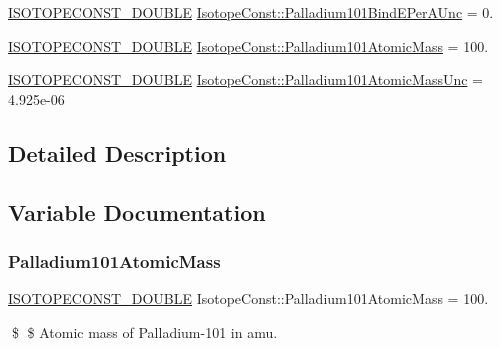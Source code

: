 \begin{DoxyCompactItemize}
\mbox{\hyperlink{group___isotope_const-_macros_ga8f45a7272ce02c0b4c65c44636ed719a}{I\+S\+O\+T\+O\+P\+E\+C\+O\+N\+S\+T\+\_\+\+D\+O\+U\+B\+LE}} \mbox{\hyperlink{group___isotope_const-_palladium-_pd101_gaee2d13e1c564da62fd571173f94e557b}{Isotope\+Const\+::\+Palladium101\+Bind\+E\+Per\+A\+Unc}} = 0.
\item 
\mbox{\hyperlink{group___isotope_const-_macros_ga8f45a7272ce02c0b4c65c44636ed719a}{I\+S\+O\+T\+O\+P\+E\+C\+O\+N\+S\+T\+\_\+\+D\+O\+U\+B\+LE}} \mbox{\hyperlink{group___isotope_const-_palladium-_pd101_gaa71177aebf9078683a5538af092f1757}{Isotope\+Const\+::\+Palladium101\+Atomic\+Mass}} = 100.
\item 
\mbox{\hyperlink{group___isotope_const-_macros_ga8f45a7272ce02c0b4c65c44636ed719a}{I\+S\+O\+T\+O\+P\+E\+C\+O\+N\+S\+T\+\_\+\+D\+O\+U\+B\+LE}} \mbox{\hyperlink{group___isotope_const-_palladium-_pd101_ga13dec64c735ec2c5944e17aa04132b6d}{Isotope\+Const\+::\+Palladium101\+Atomic\+Mass\+Unc}} = 4.\+925e-\/06
\end{DoxyCompactItemize}


\subsection{Detailed Description}


\subsection{Variable Documentation}
\mbox{\label{group___isotope_const-_palladium-_pd101_gaa71177aebf9078683a5538af092f1757}} 
\subsubsection{\texorpdfstring{Palladium101\+Atomic\+Mass}{Palladium101AtomicMass}}
{\footnotesize\ttfamily \mbox{\hyperlink{group___isotope_const-_macros_ga8f45a7272ce02c0b4c65c44636ed719a}{I\+S\+O\+T\+O\+P\+E\+C\+O\+N\+S\+T\+\_\+\+D\+O\+U\+B\+LE}} Isotope\+Const\+::\+Palladium101\+Atomic\+Mass = 100.}

\$ \$ Atomic mass of Palladium-\/101 in amu. \mbox{\label{group___isotope_const-_palladium-_pd101_ga13dec64c735ec2c5944e17aa04132b6d}} 
